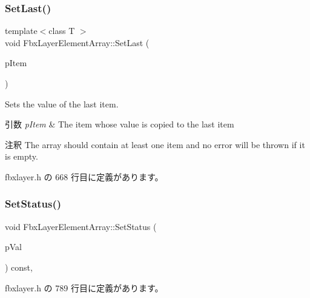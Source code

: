 \subsubsection{\texorpdfstring{Set\+Last()}{SetLast()}\hspace{0.1cm}{\footnotesize\ttfamily [2/2]}}
{\footnotesize\ttfamily template$<$class T $>$ \\
void Fbx\+Layer\+Element\+Array\+::\+Set\+Last (\begin{DoxyParamCaption}\item[{T const \&}]{p\+Item }\end{DoxyParamCaption})\hspace{0.3cm}{\ttfamily [inline]}}

Sets the value of the last item. 
\begin{DoxyParams}{引数}
{\em p\+Item} & The item whose value is copied to the last item \\
\hline
\end{DoxyParams}
\begin{DoxyRemark}{注釈}
The array should contain at least one item and no error will be thrown if it is empty. 
\end{DoxyRemark}


 fbxlayer.\+h の 668 行目に定義があります。

\mbox{\label{class_fbx_layer_element_array_ad61caca510c54feb2181fc57b61869d4}} 
\subsubsection{\texorpdfstring{Set\+Status()}{SetStatus()}}
{\footnotesize\ttfamily void Fbx\+Layer\+Element\+Array\+::\+Set\+Status (\begin{DoxyParamCaption}\item[{\hyperlink{class_lock_access_status_a3314dad01b38dd90f5393e108a07b3c1}{Lock\+Access\+Status\+::\+E\+Lock\+Access\+Status}}]{p\+Val }\end{DoxyParamCaption}) const\hspace{0.3cm}{\ttfamily [inline]}, {\ttfamily [protected]}}



 fbxlayer.\+h の 789 行目に定義があります。

\mbox{\label{class_fbx_layer_element_array_a828b1e27e5025c726bdc15b983522e4e}} 
